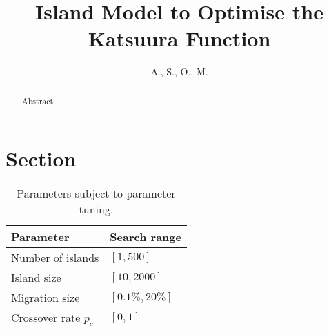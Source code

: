 \documentclass[letterpaper, 10 pt, conference]{ieeeconf}  %
\title{\LARGE \bf
Island Model to Optimise the Katsuura Function
}
\author{A., S., O., M.}
\begin{document}
\maketitle
\thispagestyle{empty}
\pagestyle{empty}


\begin{abstract}

Abstract

\end{abstract}


\section{Section}

\begin{table}[]
\caption{Parameters subject to parameter tuning.}
\label{tab:my_label}
\centering
\begin{tabular}{>{\quad}ll}
\toprule
\textbf{Parameter} & \textbf{Search range} \\
\midrule
Number of islands   & $[1,500]$ \\
Island size & $[10,2000]$ \\
Migration size      & $[0.1\%,20\%]$ \\
Crossover rate $p_c$ & $[0,1]$ \\
\bottomrule
\end{tabular}
\end{table}
\end{document}
